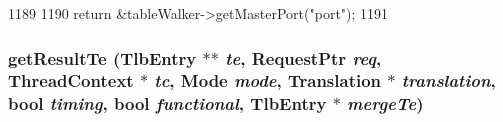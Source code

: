 \begin{DoxyCode}
1189 {
1190     return &tableWalker->getMasterPort("port");
1191 }
\end{DoxyCode}
\hypertarget{classArmISA_1_1TLB_a0743624c3e13c3dd3108be8847f8e488}{
\subsubsection[{getResultTe}]{ getResultTe ({\bf TlbEntry} $\ast$$\ast$ {\em te}, \/  {\bf RequestPtr} {\em req}, \/  {\bf ThreadContext} $\ast$ {\em tc}, \/  {\bf Mode} {\em mode}, \/  {\bf Translation} $\ast$ {\em translation}, \/  bool {\em timing}, \/  bool {\em functional}, \/  {\bf TlbEntry} $\ast$ {\em mergeTe})}}
\label{classArmISA_1_1TLB_a0743624c3e13c3dd3108be8847f8e488}



